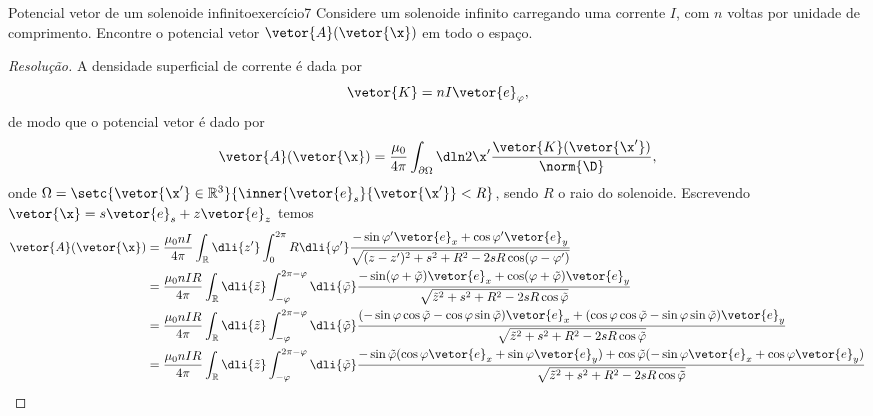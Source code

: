\begin{exercício}{Potencial vetor de um solenoide infinito}{exercício7}
    Considere um solenoide infinito carregando uma corrente \(I\), com \(n\) voltas por unidade de comprimento. Encontre o potencial vetor \(\vetor{A}(\vetor{\x})\) em todo o espaço.
\end{exercício}
\begin{proof}[Resolução]
    A densidade superficial de corrente é dada por
    \begin{equation*}
        \vetor{K} = n I \vetor{e}_{\varphi},
    \end{equation*}
    de modo que o potencial vetor é dado por
    \begin{equation*}
        \vetor{A}(\vetor{\x}) = \frac{\mu_0}{4\pi}\int_{\partial\Omega} \dln2{\x'} \frac{\vetor{K}(\vetor{\x'})}{\norm{\D}},
    \end{equation*}
    onde \(\Omega = \setc{\vetor{\x'} \in \mathbb{R}^3}{\inner{\vetor{e}_s}{\vetor{\x'}} < R}\), sendo \(R\) o raio do solenoide. Escrevendo \(\vetor{\x} = s \vetor{e}_s + z \vetor{e}_z\) temos
    \begin{align*}
        \vetor{A}(\vetor{\x}) &= \frac{\mu_0 n I}{4\pi} \int_{\mathbb{R}} \dli{z'} \int_{0}^{2\pi} R \dli{\varphi'} \frac{-\sin\varphi'\vetor{e}_x + \cos\varphi' \vetor{e}_y}{\sqrt{(z - z')^2 + s^2 + R^2 - 2 s R \cos(\varphi - \varphi')}}\\
                              &= \frac{\mu_0 n IR}{4\pi}\int_{\mathbb{R}} \dli{\tilde{z}} \int_{-\varphi}^{2\pi - \varphi}\dli{\tilde{\varphi}} \frac{-\sin(\varphi + \tilde{\varphi})\vetor{e}_x + \cos(\varphi + \tilde{\varphi})\vetor{e}_y}{\sqrt{\tilde{z}^2 + s^2 + R^2 - 2 s R \cos\tilde{\varphi}}}\\
                              &= \frac{\mu_0 n IR}{4\pi}\int_{\mathbb{R}} \dli{\tilde{z}} \int_{-\varphi}^{2\pi - \varphi}\dli{\tilde{\varphi}} \frac{(-\sin\varphi\cos\tilde\varphi - \cos\varphi\sin\tilde{\varphi})\vetor{e}_x + (\cos\varphi\cos\tilde{\varphi} - \sin\varphi\sin\tilde\varphi)\vetor{e}_y}{\sqrt{\tilde{z}^2 + s^2 + R^2 - 2 s R \cos\tilde{\varphi}}}\\
                              &= \frac{\mu_0 n IR}{4\pi}\int_{\mathbb{R}} \dli{\tilde{z}} \int_{-\varphi}^{2\pi - \varphi}\dli{\tilde{\varphi}} \frac{-\sin\tilde\varphi (\cos\varphi \vetor{e}_x + \sin\varphi \vetor{e}_y) + \cos\tilde\varphi(-\sin\varphi \vetor{e}_x + \cos\varphi \vetor{e}_y)}{\sqrt{\tilde{z}^2 + s^2 + R^2 - 2 s R \cos\tilde{\varphi}}}\\

\end{align*}
\end{proof}
